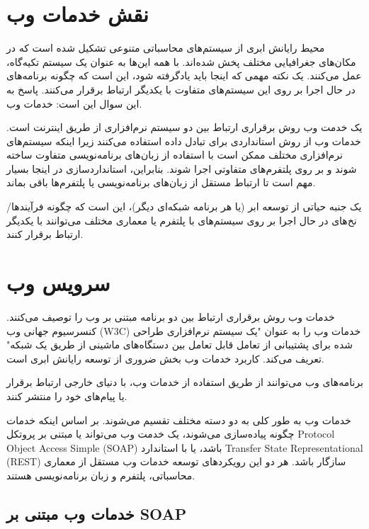 \documentclass{book}
\begin{document}
        \section{نقش خدمات وب}

            محیط رایانش ابری از سیستم‌های محاسباتی متنوعی تشکیل شده است که در مکان‌های جغرافیایی مختلف پخش شده‌اند. با همه این‌ها به عنوان یک سیستم تکیه‌گاه، عمل می‌کنند. یک نکته مهمی که اینجا باید یادگرفته شود، این است که چگونه برنامه‌های در حال اجرا بر روی این سیستم‌های متفاوت با یکدیگر ارتباط برقرار می‌کنند. پاسخ به این سوال این است: خدمات وب.

            یک خدمت وب روش برقراری ارتباط بین دو سیستم نرم‌افزاری از طریق اینترنت است. خدمات وب از روش استانداردی برای تبادل داده استفاده می‌کنند زیرا اینکه سیستم‌های نرم‌افزاری مختلف ممکن است با استفاده از زبان‌های برنامه‌نویسی متفاوت ساخته شوند و بر روی پلتفرم‌های متفاوتی اجرا شوند. بنابراین، استانداردسازی در اینجا بسیار مهم است تا ارتباط مستقل از زبان‌های برنامه‌نویسی یا پلتفرم‌ها باقی بماند.

            \begin{addinfo}
                
                یک جنبه حیاتی از توسعه ابر (یا هر برنامه شبکه‌ای دیگر)، این است که چگونه فرآیندها/نخ‌های در حال اجرا بر روی سیستم‌های با پلتفرم یا معماری مختلف می‌توانند با یکدیگر ارتباط برقرار کنند.

            \end{addinfo}
        
        \section{سرویس وب}

            خدمات وب روش برقراری ارتباط بین دو برنامه مبتنی بر وب را توصیف می‌کنند. کنسرسیوم جهانی وب (W3C) خدمات وب را به عنوان "یک سیستم نرم‌افزاری طراحی شده برای پشتیبانی از تعامل قابل تعامل بین دستگاه‌های ماشینی از طریق یک شبکه" تعریف می‌کند. کاربرد خدمات وب بخش ضروری از توسعه رایانش ابری است.

            \begin{addinfo}
                
                برنامه‌های وب می‌توانند از طریق استفاده از خدمات وب، با دنیای خارجی ارتباط برقرار یا پیام‌های خود را منتشر کنند.

            \end{addinfo}

            خدمات وب به طور کلی به دو دسته مختلف تقسیم می‌شوند. بر اساس اینکه خدمات چگونه پیاده‌سازی می‌شوند، یک خدمت وب می‌تواند یا مبتنی بر پروتکل Protocol Object Access Simple (SOAP) باشد، یا با استاندارد Transfer State Representational (REST) سازگار باشد. هر دو این رویکردهای توسعه خدمات وب مستقل از معماری محاسباتی، پلتفرم و زبان برنامه‌نویسی هستند.

            \subsection{خدمات وب مبتنی بر SOAP}

                
\end{document}
